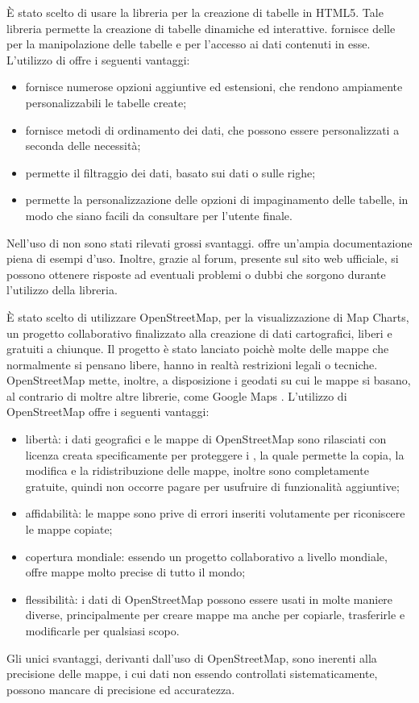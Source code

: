 È stato scelto di usare la libreria   per la creazione di tabelle in HTML5. Tale libreria permette la creazione di tabelle dinamiche ed interattive.  fornisce delle  per la manipolazione delle tabelle e per l'accesso ai dati contenuti in esse. 
L'utilizzo di  offre i seguenti vantaggi:
\begin{itemize}
\item fornisce numerose opzioni aggiuntive ed estensioni, che rendono ampiamente personalizzabili le tabelle create;
\item fornisce metodi di ordinamento dei dati, che possono essere personalizzati a seconda delle necessità;
\item permette il filtraggio dei dati, basato sui dati o sulle righe;
\item permette la personalizzazione delle opzioni di impaginamento delle tabelle, in modo che siano facili da consultare per l'utente finale.
\end{itemize}
Nell'uso di  non sono stati rilevati grossi svantaggi.  offre un'ampia documentazione piena di esempi d'uso. Inoltre, grazie al forum, presente sul sito web ufficiale, si possono ottenere risposte ad eventuali problemi o dubbi che sorgono durante l'utilizzo della libreria.

È stato scelto di utilizzare OpenStreetMap, per la visualizzazione di Map Charts, un progetto collaborativo finalizzato alla creazione di dati cartografici, liberi e gratuiti a chiunque. Il progetto è stato lanciato poichè molte delle mappe che normalmente si pensano libere, hanno in realtà restrizioni legali o tecniche. OpenStreetMap mette, inoltre, a disposizione i geodati su cui le mappe si basano, al contrario di moltre altre librerie, come Google Maps .
L'utilizzo di OpenStreetMap offre i seguenti vantaggi:
\begin{itemize}
\item libertà: i dati geografici e le mappe di OpenStreetMap sono rilasciati con licenza creata specificamente per proteggere i , la quale permette la copia, la modifica e la ridistribuzione delle mappe, inoltre sono completamente gratuite, quindi non occorre pagare per usufruire di funzionalità aggiuntive;
\item affidabilità: le mappe sono prive di errori inseriti volutamente per riconiscere le mappe copiate;
\item copertura mondiale: essendo un progetto collaborativo a livello mondiale, offre mappe molto precise di tutto il mondo;
\item flessibilità: i dati di OpenStreetMap possono essere usati in molte maniere diverse, principalmente per creare mappe ma anche per copiarle, trasferirle e modificarle per qualsiasi scopo.
\end{itemize}
Gli unici svantaggi, derivanti dall'uso di OpenStreetMap, sono inerenti alla precisione delle mappe, i cui dati non essendo controllati sistematicamente, possono mancare di precisione ed accuratezza.


